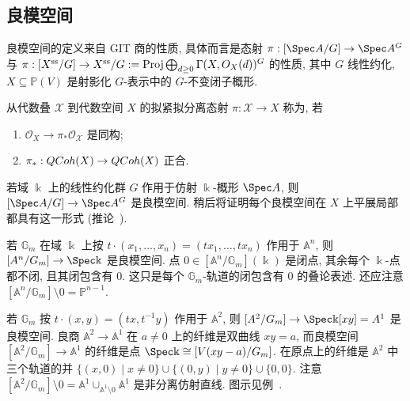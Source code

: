 \subsection{良模空间}\label{src:7.5.1-subsection}
良模空间的定义来自 GIT 商的性质, 具体而言是态射 $\pi:[\Spec A/G]\to\Spec A^G$ 与
$\pi:[X^{\mathrm{ss}}/G]\to X^{\mathrm{ss}}/G:=\operatorname{Proj}\bigoplus_{d\ge0}\Gamma(X,O_X(d))^G$ 的性质, 其中 $G$ 线性约化, $X\subseteq\mathbb P(V)$ 是射影化 $G$-表示中的 $G$-不变闭子概形.
\begin{definition}[良模空间]\label{src:7.5.5}
从代数叠 $\mathcal X$ 到代数空间 $X$ 的拟紧拟分离态射 $\pi:\mathcal X\to X$ 称为, 若
\begin{enumerate}[(1)]
\item $\mathcal O_X\to\pi_*\mathcal O_{\mathcal X}$ 是同构;
\item $\pi_*:QCoh(X)\to QCoh(X)$ 正合.
\end{enumerate}
\end{definition}
\begin{example}\label{src:7.5.6}
若域 $\Bbbk$ 上的线性约化群 $G$ 作用于仿射 $\Bbbk$-概形 $\Spec A$, 则 $[\Spec A/G]\to\Spec A^G$ 是良模空间. 稍后将证明每个良模空间在 $X$ 上平展局部都具有这一形式 (推论~).
\end{example}
\begin{example}[具体例子]\label{src:7.5.7}
若 $\mathbb G_m$ 在域 $\Bbbk$ 上按 $t\cdot(x_1,\ldots,x_n)=(tx_1,\ldots,tx_n)$ 作用于 $\mathbb A^n$, 则 $[\mathbb A^n/\mathbb G_m]\to\Spec\Bbbk$ 是良模空间. 点 $0\in[\mathbb A^n/\mathbb G_m](\Bbbk)$ 是闭点, 其余每个 $\Bbbk$-点都不闭, 且其闭包含有 $0$. 这只是每个 $\mathbb G_m$-轨道的闭包含有 $0$ 的叠论表述. 还应注意 $[\mathbb A^n/\mathbb G_m]\setminus0=\mathbb P^{n-1}$.

若 $\mathbb G_m$ 按 $t\cdot(x,y)=(tx,t^{-1}y)$ 作用于 $\mathbb A^2$, 则 $[\mathbb A^2/\mathbb G_m]\to\Spec\Bbbk[xy]=\mathbb A^1$ 是良模空间. 良商 $\mathbb A^2\to\mathbb A^1$ 在 $a\ne0$ 上的纤维是双曲线 $xy=a$, 而良模空间 $[\mathbb A^2/\mathbb G_m]\to\mathbb A^1$ 的纤维是点 $\Spec\Bbbk\cong[V(xy-a)/\mathbb G_m]$. 在原点上的纤维是 $\mathbb A^2$ 中三个轨道的并 $\{(x,0)\mid x\ne0\}\cup\{(0,y)\mid y\ne0\}\cup\{0,0\}$. 注意 $[\mathbb A^2/\mathbb G_m]\setminus0=\mathbb A^1\cup_{\mathbb A^1\setminus0}\mathbb A^1$ 是非分离仿射直线. 图示见例~.
\end{example}
